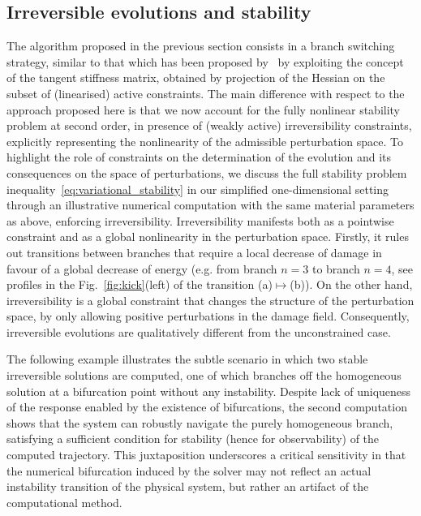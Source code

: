 \subsection{Irreversible evolutions and stability}
{The algorithm proposed in the previous section consists in a branch switching strategy,
    similar to that which has been proposed by~\cite{Baldelli2021-gc} by exploiting the concept of the tangent stiffness matrix, obtained by projection of the Hessian on the subset of (linearised) active constraints.
    The main difference with respect to the approach proposed here is that
    we now account for the fully nonlinear stability problem at second order, in presence of (weakly active) irreversibility constraints, explicitly representing the nonlinearity of the admissible perturbation space.
}
To highlight the role of constraints on the determination of the evolution and its consequences on the space of perturbations, we discuss the full stability problem inequality~\eqref{eq:variational_stability} in our simplified one-dimensional setting through an illustrative numerical computation with the same material parameters as above, enforcing irreversibility.
% 
Irreversibility manifests both as a pointwise constraint and as a global nonlinearity in the perturbation space.
Firstly, it rules out transitions between branches that require a local decrease of damage in favour of a global decrease of energy (e.g. from branch $n=3$ to branch $n=4$, see profiles in the Fig.~\ref{fig:kick}(left) of the transition (a)$\mapsto$(b)).
On the other hand, irreversibility is a global constraint that changes the structure of the perturbation space, by only allowing positive perturbations in the damage field.
% 
Consequently, irreversible evolutions are qualitatively different from the unconstrained case.

The following example illustrates the subtle scenario in which two stable irreversible solutions are computed, one of which branches off the homogeneous solution at a bifurcation point without any instability.
Despite lack of uniqueness of the response enabled by the existence of bifurcations, the second computation shows that the system can robustly navigate the purely homogeneous branch, satisfying a sufficient condition for stability (hence for observability) of the computed trajectory.
This juxtaposition underscores a critical sensitivity in that the numerical bifurcation induced by the solver may not reflect an actual instability transition of the physical system, but rather an artifact of the computational method.

